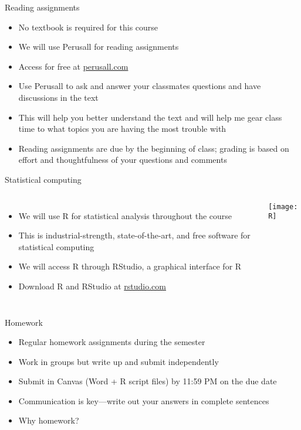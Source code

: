 \documentclass{beamer}\usepackage[]{graphicx}\usepackage[]{color}
\begin{document}
\begin{darkframes}
    \begin{frame}{Reading assignments}
      \begin{itemize}
        \item No textbook is required for this course
        \item We will use \alert{Perusall} for reading assignments
        \item Access for free at \url{perusall.com}
        \item Use Perusall to ask and answer your classmates questions and have discussions in the text
        \item This will help you better understand the text and will help me gear class time to what topics you are having the most trouble with
        \item Reading assignments are due by the beginning of class; grading is based on effort and thoughtfulness of your questions and comments
      \end{itemize}
    \end{frame}


    \begin{frame}{Statistical computing}
      \begin{columns}[onlytextwidth]
          \begin{itemize}
            \item We will use \alert{R} for statistical analysis throughout the course
            \item This is industrial-strength, state-of-the-art, and free software for statistical computing
            \item We will access R through \alert{RStudio}, a graphical interface for R
            \item Download R and RStudio at \url{rstudio.com}
          \end{itemize}
          \texttt{[image: R]}
      \end{columns}
    \end{frame}

    \begin{frame}{Homework}
      \begin{itemize}
        \item Regular homework assignments during the semester
        \item Work in groups but write up and submit independently
        \item Submit in Canvas (Word + R script files) by 11:59 PM on the due date
        \item Communication is key---write out your answers in complete sentences
        \item Why homework?
      \end{itemize}
    \end{frame}


\end{darkframes}
\end{document}
